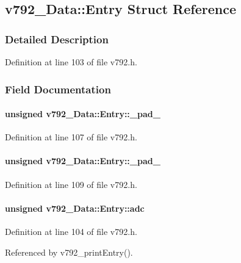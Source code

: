 \subsection{v792\_\-Data::Entry Struct Reference}
\label{structv792__Data_1_1Entry}


\subsubsection{Detailed Description}


Definition at line 103 of file v792.h.

\subsubsection{Field Documentation}
\paragraph[{\_\-pad\_\-1}]{\setlength{\rightskip}{0pt plus 5cm}unsigned {\bf v792\_\-Data::Entry::\_\-pad\_}}\hfill\label{structv792__Data_1_1Entry_aa42b87cf6d042b3ff1f0e7de9650141c}


Definition at line 107 of file v792.h.
\paragraph[{\_\-pad\_\-2}]{\setlength{\rightskip}{0pt plus 5cm}unsigned {\bf v792\_\-Data::Entry::\_\-pad\_}}\hfill\label{structv792__Data_1_1Entry_a31f8f5cab04d81e7561aa941085adb60}


Definition at line 109 of file v792.h.
\paragraph[{adc}]{\setlength{\rightskip}{0pt plus 5cm}unsigned {\bf v792\_\-Data::Entry::adc}}\hfill\label{structv792__Data_1_1Entry_af7aaa7c9e992fa261e7094e2c9d29b9b}


Definition at line 104 of file v792.h.

Referenced by v792\_\-printEntry().
